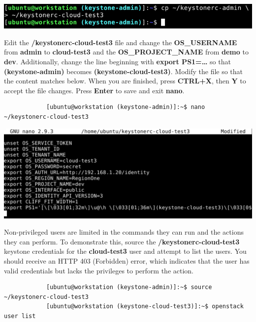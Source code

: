 \documentclass[letterpaper, 12pt]{article}
\begin{document}
\begin{enumerate}
\begin{labstep}
        \begin{center}
            \includegraphics[width=\linewidth]{images/part4/step9.png}
        \end{center}
    \end{labstep}

    \begin{labstep}
        Edit the \textbf{\texttildemid/keystonerc-cloud-test3} file and change the \textbf{OS\_USERNAME} from \textbf{admin} to \textbf{cloud-test3} and the \textbf{OS\_PROJECT\_NAME} from \textbf{demo} to \textbf{dev}.
        Additionally, change the line beginning with \textbf{export PS1=…} so that \textbf{(keystone-admin)} becomes \textbf{(keystone-cloud-test3)}.
        Modify the file so that the content matches below.
        When you are finished, press \textbf{CTRL+X}, then \textbf{Y} to accept the file changes.
        Press \textbf{Enter} to save and exit \textbf{nano}.
        \begin{lstlisting}
            [ubuntu@workstation (keystone-admin)]:~$ nano ~/keystonerc-cloud-test3
        \end{lstlisting}

        \begin{center}
            \includegraphics[width=\linewidth]{images/part4/step10.png}
        \end{center}
    \end{labstep}

    \begin{labstep}
        Non-privileged users are limited in the commands they can run and the actions they can perform.
        To demonstrate this, source the \textbf{\texttildemid/keystonerc-cloud-test3} keystone credentials for the \textbf{cloud-test3} user and attempt to list the users.
        You should receive an HTTP 403 (Forbidden) error, which indicates that the user has valid credentials but lacks the privileges to perform the action.
        \begin{lstlisting}
            [ubuntu@workstation (keystone-admin)]:~$ source ~/keystonerc-cloud-test3
            [ubuntu@workstation (keystone-cloud-test3)]:~$ openstack user list
        \end{lstlisting}


\end{labstep}
\end{enumerate}
\end{document}
